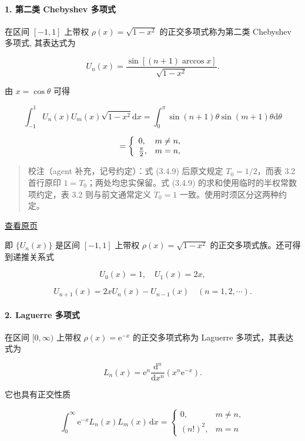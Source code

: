 \documentclass[
  10pt,
  fontset=fandol]{ctexart}
\begin{document}
\paragraph{1. 第二类 Chebyshev 多项式}\label{ux7b2cux4e8cux7c7b-chebyshev-ux591aux9879ux5f0f}

在区间 \([-1,1]\) 上带权 \(\rho(x) = \sqrt{1-x^2}\) 的正交多项式称为第二类 Chebyshev 多项式, 其表达式为

\[
U_n(x) = \frac{\sin[(n+1)\arccos x]}{\sqrt{1-x^2}}. \tag{3.4.10}
\]

由 \(x=\cos\theta\) 可得

\[
\int_{-1}^{1} U_n(x) U_m(x) \sqrt{1-x^2} \mathrm{d}x = \int_{0}^{\pi} \sin(n+1)\theta \sin(m+1)\theta \mathrm{d}\theta
\]

\[
= \left\{ \begin{array}{l l} 0, & m \neq n, \\ \frac{\pi}{2}, & m=n, \end{array} \right.
\]

\begin{quote}
校注（agent 补充，记号约定）：式 (3.4.9) 后原文规定 \(T_0=1/2\)，而表 3.2 首行原印 \(1=T_0\)；两处均忠实保留。式 (3.4.9) 的求和使用临时的半权常数项约定，表 3.2 则与前文通常定义 \(T_0=1\) 一致。使用时须区分这两种约定。
\end{quote}

\href{../../source-images/pdf-076.jpeg}{查看原页}

即 \(\{U_n(x)\}\) 是区间 \([-1,1]\) 上带权 \(\rho(x)=\sqrt{1-x^2}\) 的正交多项式族。还可得到递推关系式

\[
U_0(x)=1,\quad U_1(x)=2x,
\]

\[
U_{n+1}(x)=2xU_n(x)-U_{n-1}(x)\quad(n=1,2,\cdots).
\]

\paragraph{2. Laguerre 多项式}\label{laguerre-ux591aux9879ux5f0f}

在区间 \([0,\infty)\) 上带权 \(\rho(x)=\mathrm e^{-x}\) 的正交多项式称为 Laguerre 多项式，其表达式为

\[
L_n(x)=\mathrm e^n\frac{\mathrm d^n}{\mathrm dx^n}(x^n\mathrm e^{-x}).\tag{3.4.11}
\]

它也具有正交性质

\[
\int_0^\infty \mathrm e^{-x}L_n(x)L_m(x)\,\mathrm dx=
\begin{cases}
0,&m\ne n,\\
(n!)^2,&m=n
\end{cases}
\]
\end{document}
